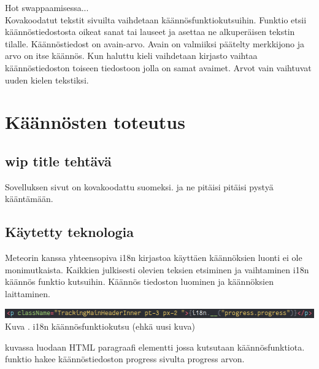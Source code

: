\documentclass[11pt,a4paper,titlepage,oneside]{article}
\begin{document}
Hot swappaamisessa...\\
Kovakoodatut tekstit sivuilta vaihdetaan käännösfunktiokutsuihin.
Funktio etsii käännöstiedostosta oikeat sanat tai lauseet ja asettaa ne alkuperäisen tekstin tilalle. 
Käännöstiedost on avain-arvo. %
Avain on valmiiksi päätelty merkkijono ja arvo on itse käännös. 
Kun haluttu kieli vaihdetaan kirjasto vaihtaa käännöstiedoston toiseen tiedostoon jolla on samat avaimet. 
Arvot vain vaihtuvat uuden kielen tekstiksi.\citemissing
\medskip












\newpage






\section{Käännösten toteutus}

\subsection{wip title tehtävä}
Sovelluksen sivut on kovakoodattu suomeksi. ja ne pitäisi pitäisi pystyä kääntämään.
\medskip


\subsection{Käytetty teknologia}
Meteorin kanssa yhteensopiva i18n kirjastoa käyttäen käännöksien luonti ei ole monimutkaista.
Kaikkien julkisesti olevien teksien etsiminen ja vaihtaminen i18n käännös funktio kutsuihin.
Käännös tiedoston luominen ja käännöksien laittaminen.
\medskip
\bigskip


\includegraphics[width = 15cm]{src/public/oppar/translationcall.png}\\
Kuva \getImgCount. {} i18n käännösfunktiokutsu (ehkä uusi kuva)
\medskip

kuvassa luodaan HTML paragraafi elementti jossa kutsutaan käännösfunktiota. funktio hakee käännöstiedoston progress sivulta progress arvon.
\bigskip
\end{document}
